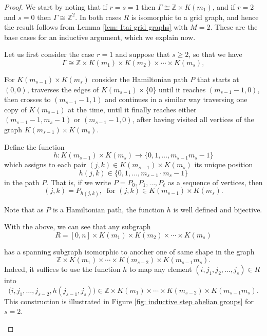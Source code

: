 \documentclass[reqno,oneside]{amsart}
\newcommand{\Z}{\mathbb{Z}}
\theoremstyle{plain}
\theoremstyle{definition}
\begin{document}
\begin{proof}
	We start by noting that if $r=s=1$ then $\Gamma\cong\Z\times K(m_1)$, and if $r=2$ and $s=0$ then $\Gamma\cong\Z^2$. In both cases $R$ is isomorphic to a grid graph, and hence the result follows from Lemma \ref{lem: Itai grid graphs} with $M=2$. These are the base cases for an inductive argument, which we explain now.
	
	
	Let us first consider the case $r=1$ and suppose that $s\ge 2$,  so that we have
	$$
	\Gamma\cong \Z\times  K(m_1)\times K(m_2)\times \cdots \times K(m_s), 
	$$
	
	For \(K(m_{s-1})\times K(m_{s})\) consider the Hamiltonian path $P$ that starts at $(0,0)$, traverses the edges of $K(m_{s-1})\times \{0\}$ until it reaches $(m_{s-1}-1,0)$, then crosses to $(m_{s-1}-1,1)$ and continues in a similar way traversing one copy of $K(m_{s-1})$ at the time, until it finally reaches either $(m_{s-1}-1,m_s-1)$ or $(m_{s-1}-1,0)$, after having visited all vertices of the graph \( K(m_{s-1})\times K(m_{s})\).
	
	
	Define the function $$h:K(m_{s-1})\times K(m_{s})\to \{0,1,\ldots, m_{s-1}m_s-1\}$$ which assigns to each pair $(j,k)\in  K(m_{s-1})\times K(m_{s})$ its unique position $$h(j,k)\in \{0,1,\ldots, m_{s-1}\cdot m_s-1\}$$ in the path $P$. That is, if we write $P=P_0,P_1,\ldots,P_{\ell}$ as a sequence of vertices, then $$
	(j,k)=P_{h(j,k)}, \ \text{  for  }(j,k)\in  K(m_{s-1})\times K(m_{s}).
	$$
	
	Note that as $P$ is a Hamiltonian path, the function $h$ is well defined and bijective.
	
	With the above, we can see that any subgraph $$R=[0,n]\times  K(m_1)\times K(m_2)\times \cdots \times K(m_s)$$
	
	has a spanning subgraph isomorphic to another one of same shape in the graph $$\Z\times  K(m_1)\times \cdots \times K(m_{s-2}) \times K(m_{s-1}m_s).$$ Indeed, it suffices to use the function $h$ to map any element $(i,j_1,j_2,\ldots,j_s)\in R$ into $$\big(i,j_1,\ldots,j_{s-2},h(j_{s-1},j_s)\big)\in \Z\times  K(m_1)\times \cdots \times K(m_{s-2})\times  K(m_{s-1}m_s).$$ This construction is illustrated in Figure \ref{fig: inductive step abelian groups} for $s=2$.
	
	
	\begin{figure*}[h!]
		\centering
		
		\caption{Inductive step of the proof of Lemma \ref{lem: rectangles are quasi-Hamiltonian-connected}.}
		\label{fig: inductive step abelian groups}
	\end{figure*}
	

\end{proof}
\end{document}
